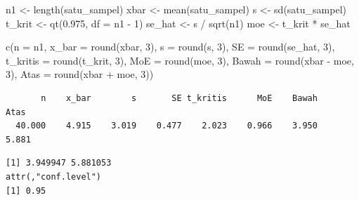 \documentclass[
  indonesian,
  letterpaper,
]{book}
\newenvironment{Shaded}{\begin{snugshade}}{\end{snugshade}}
\newcommand{\AttributeTok}[1]{\textcolor[rgb]{0.40,0.45,0.13}{#1}}
\newcommand{\CommentTok}[1]{\textcolor[rgb]{0.37,0.37,0.37}{#1}}
\newcommand{\DecValTok}[1]{\textcolor[rgb]{0.68,0.00,0.00}{#1}}
\newcommand{\FloatTok}[1]{\textcolor[rgb]{0.68,0.00,0.00}{#1}}
\newcommand{\FunctionTok}[1]{\textcolor[rgb]{0.28,0.35,0.67}{#1}}
\newcommand{\NormalTok}[1]{\textcolor[rgb]{0.00,0.23,0.31}{#1}}
\newcommand{\OtherTok}[1]{\textcolor[rgb]{0.00,0.23,0.31}{#1}}
\newcommand{\SpecialCharTok}[1]{\textcolor[rgb]{0.37,0.37,0.37}{#1}}
\begin{document}
\begin{Shaded}
\begin{Highlighting}[]
\NormalTok{n1 }\OtherTok{\textless{}{-}} \FunctionTok{length}\NormalTok{(satu\_sampel)}
\NormalTok{xbar }\OtherTok{\textless{}{-}} \FunctionTok{mean}\NormalTok{(satu\_sampel)}
\NormalTok{s }\OtherTok{\textless{}{-}} \FunctionTok{sd}\NormalTok{(satu\_sampel)}
\NormalTok{t\_krit }\OtherTok{\textless{}{-}} \FunctionTok{qt}\NormalTok{(}\FloatTok{0.975}\NormalTok{, }\AttributeTok{df =}\NormalTok{ n1 }\SpecialCharTok{{-}} \DecValTok{1}\NormalTok{)}
\NormalTok{se\_hat }\OtherTok{\textless{}{-}}\NormalTok{ s }\SpecialCharTok{/} \FunctionTok{sqrt}\NormalTok{(n1)}
\NormalTok{moe }\OtherTok{\textless{}{-}}\NormalTok{ t\_krit }\SpecialCharTok{*}\NormalTok{ se\_hat}

\FunctionTok{c}\NormalTok{(}\AttributeTok{n =}\NormalTok{ n1,}
  \AttributeTok{x\_bar =} \FunctionTok{round}\NormalTok{(xbar, }\DecValTok{3}\NormalTok{),}
  \AttributeTok{s =} \FunctionTok{round}\NormalTok{(s, }\DecValTok{3}\NormalTok{),}
  \AttributeTok{SE =} \FunctionTok{round}\NormalTok{(se\_hat, }\DecValTok{3}\NormalTok{),}
  \AttributeTok{t\_kritis =} \FunctionTok{round}\NormalTok{(t\_krit, }\DecValTok{3}\NormalTok{),}
  \AttributeTok{MoE =} \FunctionTok{round}\NormalTok{(moe, }\DecValTok{3}\NormalTok{),}
  \AttributeTok{Bawah =} \FunctionTok{round}\NormalTok{(xbar }\SpecialCharTok{{-}}\NormalTok{ moe, }\DecValTok{3}\NormalTok{),}
  \AttributeTok{Atas =} \FunctionTok{round}\NormalTok{(xbar }\SpecialCharTok{+}\NormalTok{ moe, }\DecValTok{3}\NormalTok{))}
\end{Highlighting}
\end{Shaded}

\begin{verbatim}
       n    x_bar        s       SE t_kritis      MoE    Bawah     Atas 
  40.000    4.915    3.019    0.477    2.023    0.966    3.950    5.881 
\end{verbatim}

\begin{Shaded}
\end{Shaded}

\begin{verbatim}
[1] 3.949947 5.881053
attr(,"conf.level")
[1] 0.95
\end{verbatim}
\end{document}
